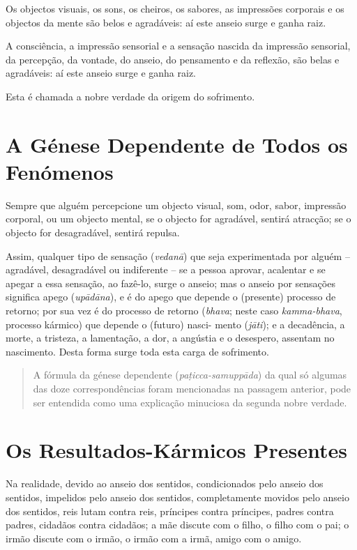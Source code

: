 Os objectos visuais, os sons, os cheiros, os sabores, as impressões corporais e
os objectos da mente são belos e agradáveis: aí este anseio surge e ganha raiz.

A consciência, a impressão sensorial e a sensação nascida da impressão
sensorial, da percepção, da vontade, do anseio, do pensamento e da reflexão, são
belas e agradáveis: aí este anseio surge e ganha raiz.

Esta é chamada a nobre verdade da origem do sofrimento.


\section{A Génese Dependente de Todos os Fenómenos}

Sempre que alguém percepcione um objecto visual, som, odor, sabor, impressão
corporal, ou um objecto mental, se o objecto for agradável, sentirá atracção; se
o objecto for desagradável, sentirá repulsa.

Assim, qualquer tipo de sensação (\emph{vedanā}) que seja experimentada por
alguém -- agradável, desagradável ou indiferente -- se a pessoa aprovar,
acalentar e se apegar a essa sensação, ao fazê-lo, surge o anseio; mas o anseio
por sensações significa apego (\emph{upādāna}), e é do apego que depende o
(presente) processo de retorno; por sua vez é do processo de retorno
(\emph{bhava}; neste caso \emph{kamma-bhava}, processo kármico) que depende o
(futuro) nasci- mento (\emph{jāti}); e a decadência, a morte, a tristeza, a
lamentação, a dor, a angústia e o desespero, assentam no nascimento. Desta forma
surge toda esta carga de sofrimento.


\begin{quote}
  A fórmula da génese dependente (\emph{pa\d{t}icca-samuppāda}) da qual só algumas das
  doze correspondências foram mencionadas na passagem anterior, pode ser
  entendida como uma explicação minuciosa da segunda nobre verdade.
\end{quote}

\section{Os Resultados-Kármicos Presentes}

Na realidade, devido ao anseio dos sentidos, condicionados pelo anseio dos
sentidos, impelidos pelo anseio dos sentidos, completamente movidos pelo anseio
dos sentidos, reis lutam contra reis, príncipes contra príncipes, padres contra
padres, cidadãos contra cidadãos; a mãe discute com o filho, o filho com o pai;
o irmão discute com o irmão, o irmão com a irmã, amigo com o amigo.


